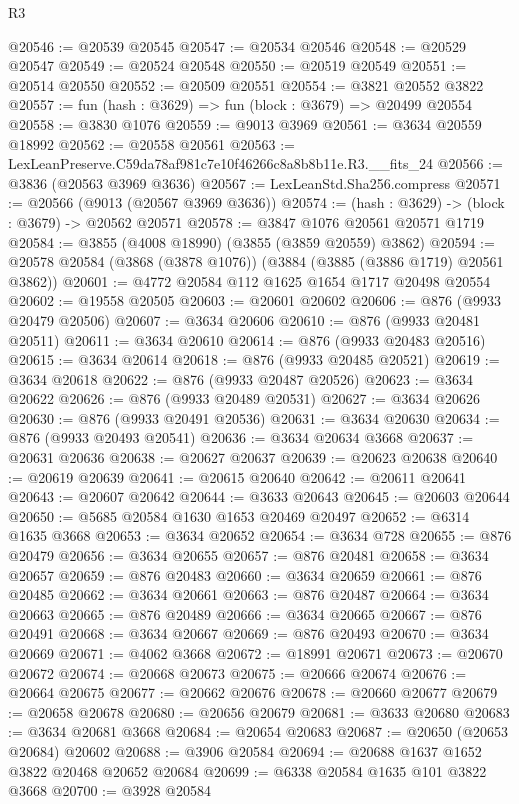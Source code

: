 \begin{lexlean}{R3}
\begin{coremodule}
@20546 := @20539 @20545
@20547 := @20534 @20546
@20548 := @20529 @20547
@20549 := @20524 @20548
@20550 := @20519 @20549
@20551 := @20514 @20550
@20552 := @20509 @20551
@20554 := @3821 @20552 @3822
@20557 := fun (hash : @3629) => fun (block : @3679) => @20499 @20554
@20558 := @3830 @1076
@20559 := @9013 @3969
@20561 := @3634 @20559 @18992
@20562 := @20558 @20561
@20563 := LexLeanPreserve.C59da78af981c7e10f46266c8a8b8b11e.R3.__fits_24
@20566 := @3836 (@20563 @3969 @3636)
@20567 := LexLeanStd.Sha256.compress
@20571 := @20566 (@9013 (@20567 @3969 @3636))
@20574 := (hash : @3629) -> (block : @3679) -> @20562 @20571
@20578 := @3847 @1076 @20561 @20571 @1719
@20584 := @3855 (@4008 @18990) (@3855 (@3859 @20559) @3862)
@20594 := @20578 @20584 (@3868 (@3878 @1076)) (@3884 (@3885 (@3886 @1719) @20561 @3862))
@20601 := @4772 @20584 @112 @1625 @1654 @1717 @20498 @20554
@20602 := @19558 @20505
@20603 := @20601 @20602
@20606 := @876 (@9933 @20479 @20506)
@20607 := @3634 @20606
@20610 := @876 (@9933 @20481 @20511)
@20611 := @3634 @20610
@20614 := @876 (@9933 @20483 @20516)
@20615 := @3634 @20614
@20618 := @876 (@9933 @20485 @20521)
@20619 := @3634 @20618
@20622 := @876 (@9933 @20487 @20526)
@20623 := @3634 @20622
@20626 := @876 (@9933 @20489 @20531)
@20627 := @3634 @20626
@20630 := @876 (@9933 @20491 @20536)
@20631 := @3634 @20630
@20634 := @876 (@9933 @20493 @20541)
@20636 := @3634 @20634 @3668
@20637 := @20631 @20636
@20638 := @20627 @20637
@20639 := @20623 @20638
@20640 := @20619 @20639
@20641 := @20615 @20640
@20642 := @20611 @20641
@20643 := @20607 @20642
@20644 := @3633 @20643
@20645 := @20603 @20644
@20650 := @5685 @20584 @1630 @1653 @20469 @20497
@20652 := @6314 @1635 @3668
@20653 := @3634 @20652
@20654 := @3634 @728
@20655 := @876 @20479
@20656 := @3634 @20655
@20657 := @876 @20481
@20658 := @3634 @20657
@20659 := @876 @20483
@20660 := @3634 @20659
@20661 := @876 @20485
@20662 := @3634 @20661
@20663 := @876 @20487
@20664 := @3634 @20663
@20665 := @876 @20489
@20666 := @3634 @20665
@20667 := @876 @20491
@20668 := @3634 @20667
@20669 := @876 @20493
@20670 := @3634 @20669
@20671 := @4062 @3668
@20672 := @18991 @20671
@20673 := @20670 @20672
@20674 := @20668 @20673
@20675 := @20666 @20674
@20676 := @20664 @20675
@20677 := @20662 @20676
@20678 := @20660 @20677
@20679 := @20658 @20678
@20680 := @20656 @20679
@20681 := @3633 @20680
@20683 := @3634 @20681 @3668
@20684 := @20654 @20683
@20687 := @20650 (@20653 @20684) @20602
@20688 := @3906 @20584
@20694 := @20688 @1637 @1652 @3822 @20468 @20652 @20684
@20699 := @6338 @20584 @1635 @101 @3822 @3668
@20700 := @3928 @20584

\end{coremodule}
\end{lexlean}
